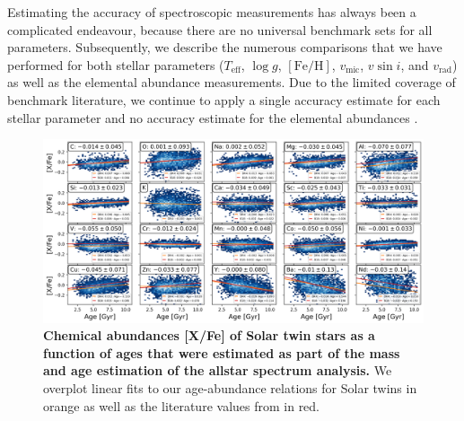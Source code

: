 \documentclass[
  journal=pasa,
  manuscript=research-paper, %
  year=2024,
  volume=37
]{cup-journal}
\newcommand{\SB}[1]{{\textcolor{purple}{#1}}}
\newcommand{\Teff}{$T_\mathrm{eff}$\xspace}
\newcommand{\logg}{$\log g$\xspace}
\newcommand{\feh}{$\mathrm{[Fe/H]}$\xspace}
\newcommand{\vmic}{$v_\mathrm{mic}$\xspace}
\newcommand{\vsini}{$v \sin i$\xspace}
\newcommand{\vrad}{$v_\mathrm{rad}$\xspace}
\begin{document}
Estimating the accuracy of spectroscopic measurements has always been a complicated endeavour, because there are no universal benchmark sets for all parameters. Subsequently, we describe the numerous comparisons that we have performed for both stellar parameters (\Teff, \logg, \feh, \vmic, \vsini, and \vrad) as well as the elemental abundance measurements. Due to the limited coverage of benchmark literature, we continue to apply a single accuracy estimate for each stellar parameter and no accuracy estimate for the elemental abundances \citep[as for GALAH DR3][]{Buder2021}.


\begin{figure}[ht]
 \centering
 \includegraphics[width=\textwidth]{figures/galah_dr4_age_xfe_trends_solar_twins_allstar.png}
 \caption{\textbf{Chemical abundances [X/Fe] of Solar twin stars as a function of ages that were estimated as part of the mass and age estimation of the allstar spectrum analysis.} We overplot linear fits to our age-abundance relations for Solar twins in orange as well as the literature values from \citet{Bedell2018} in red.}
 \label{fig:galah_dr4_age_xfe_trends_solar_twins_allstar}
\end{figure}
\end{document}
